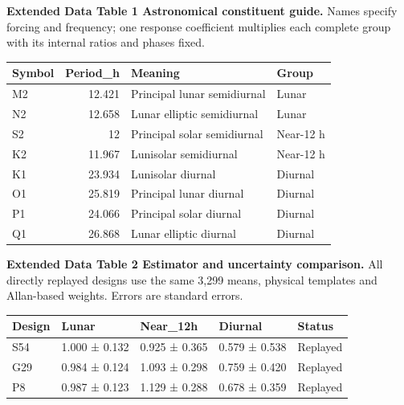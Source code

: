 \documentclass[
  12pt,
  a4paper,
]{article}
\begin{document}
\clearpage

\textbf{Extended Data Table 1 \textbar{} Astronomical constituent
guide.} Names specify forcing and frequency; one response coefficient
multiplies each complete group with its internal ratios and phases
fixed.

\begin{longtable}[]{@{}lrll@{}}
\toprule\noalign{}
Symbol & Period\_h & Meaning & Group \\
\midrule\noalign{}
\endhead
\bottomrule\noalign{}
\endlastfoot
M2 & 12.421 & Principal lunar semidiurnal & Lunar \\
N2 & 12.658 & Lunar elliptic semidiurnal & Lunar \\
S2 & 12 & Principal solar semidiurnal & Near-12 h \\
K2 & 11.967 & Lunisolar semidiurnal & Near-12 h \\
K1 & 23.934 & Lunisolar diurnal & Diurnal \\
O1 & 25.819 & Principal lunar diurnal & Diurnal \\
P1 & 24.066 & Principal solar diurnal & Diurnal \\
Q1 & 26.868 & Lunar elliptic diurnal & Diurnal \\
\end{longtable}

\clearpage

\textbf{Extended Data Table 2 \textbar{} Estimator and uncertainty
comparison.} All directly replayed designs use the same 3,299 means,
physical templates and Allan-based weights. Errors are standard errors.

\begin{longtable}[]{@{}lllll@{}}
\toprule\noalign{}
Design & Lunar & Near\_12h & Diurnal & Status \\
\midrule\noalign{}
\endhead
\bottomrule\noalign{}
\endlastfoot
S54 & 1.000 ± 0.132 & 0.925 ± 0.365 & 0.579 ± 0.538 & Replayed \\
G29 & 0.984 ± 0.124 & 1.093 ± 0.298 & 0.759 ± 0.420 & Replayed \\
P8 & 0.987 ± 0.123 & 1.129 ± 0.288 & 0.678 ± 0.359 & Replayed \\
\end{longtable}
\end{document}
